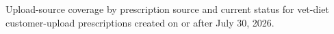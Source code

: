 Upload-source coverage by prescription source and current status for vet-diet customer-upload prescriptions created on or after July 30, 2026.

